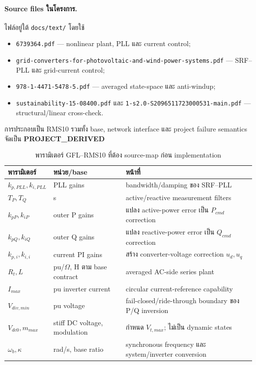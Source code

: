 \documentclass[12pt,a4paper]{article}
\newcommand{\derived}{\textcolor{teal!70!black}{\textbf{PROJECT\_DERIVED}}}
\begin{document}
\paragraph{Source files ในโครงการ.}
ไฟล์อยู่ใต้ \nolinkurl{docs/text/} โดยใช้
\begin{itemize}
\item \nolinkurl{6739364.pdf} --- nonlinear plant, PLL และ current control;
\item \nolinkurl{grid-converters-for-photovoltaic-and-wind-power-systems.pdf}
--- SRF--PLL และ grid-current control;
\item \nolinkurl{978-1-4471-5478-5.pdf} --- averaged state-space และ anti-windup;
\item \nolinkurl{sustainability-15-08400.pdf} และ
\nolinkurl{1-s2.0-S2096511723000531-main.pdf} --- structural/linear cross-check.
\end{itemize}
การประกอบเป็น RMS10 รวมทั้ง base, network interface และ project failure semantics
จัดเป็น \derived{}

\begin{table}[H]\centering\small
\caption{พารามิเตอร์ GFL--RMS10 ที่ต้อง source-map ก่อน implementation}\label{tab:gfl10-params}
\begin{tabularx}{\textwidth}{p{}p{}X}
\toprule
พารามิเตอร์ & หน่วย/base & หน้าที่ \\ \midrule
$k_{p,PLL},k_{i,PLL}$ & PLL gains & bandwidth/damping ของ SRF--PLL \\
$T_P,T_Q$ & s & active/reactive measurement filters \\
$k_{pP},k_{iP}$ & outer P gains & แปลง active-power error เป็น $P_{cmd}$ correction \\
$k_{pQ},k_{iQ}$ & outer Q gains & แปลง reactive-power error เป็น $Q_{cmd}$ correction \\
$k_{p,i},k_{i,i}$ & current PI gains & สร้าง converter-voltage correction $u_d,u_q$ \\
$R_t,L$ & pu/$\Omega$, H ตาม base contract & averaged AC-side series plant \\
$I_{max}$ & pu inverter current & circular current-reference capability \\
$V_{div,min}$ & pu voltage & fail-closed/ride-through boundary ของ P/Q inversion \\
$V_{dc0},m_{max}$ & stiff DC voltage, modulation & กำหนด $V_{t,max}$; ไม่เป็น dynamic states \\
$\omega_b,\kappa$ & rad/s, base ratio & synchronous frequency และ system/inverter conversion \\
\bottomrule
\end{tabularx}
\end{table}
\end{document}
